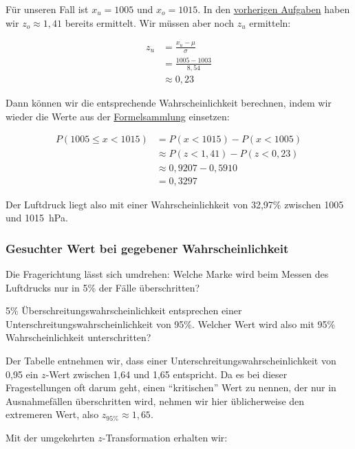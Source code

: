 \documentclass[
  11pt,
  ngerman,
  a4paper,
]{report}
\begin{document}
Für unseren Fall ist \(x_u=1005\) und \(x_o=1015\). In den \protect\hyperlink{unter}{vorherigen Aufgaben} haben wir \(z_o\approx1,41\) bereits ermittelt. Wir müssen aber noch \(z_u\) ermitteln:

\[\begin{aligned}
    z_u &= \frac{x_u-\mu}{\sigma} \\[4pt]
        &= \frac{1005-1003}{8{,}54}  \\[4pt]
        &\approx 0{,}23
\end{aligned}\]

Dann können wir die entsprechende Wahrscheinlichkeit berechnen, indem wir wieder die Werte aus der \href{Formelsammlung\%20und\%20Wertetabellen.pdf}{Formelsammlung} einsetzen:

\[
  \begin{aligned}
    P(1005 \leq x < 1015) &= P(x < 1015) - P(x < 1005) \\
    &\approx P(z < 1{,}41) - P(z < 0{,}23) \\
    &\approx 0{,}9207- 0{,}5910  \\
    &= 0{,}3297
  \end{aligned}
\]

Der Luftdruck liegt also mit einer Wahrscheinlichkeit von 32,97\% zwischen 1005 und 1015~hPa.

\hypertarget{gesuchter-wert-bei-gegebener-wahrscheinlichkeit}{%
\subsubsection{Gesuchter Wert bei gegebener Wahrscheinlichkeit}\label{gesuchter-wert-bei-gegebener-wahrscheinlichkeit}}

Die Fragerichtung lässt sich umdrehen: Welche Marke wird beim Messen des Luftdrucks nur in 5\% der Fälle überschritten?

5\% Überschreitungswahrscheinlichkeit entsprechen einer Unterschreitungswahrscheinlichkeit von 95\%. Welcher Wert wird also mit 95\% Wahrscheinlichkeit unterschritten?

Der Tabelle entnehmen wir, dass einer Unterschreitungswahrscheinlichkeit von 0,95 ein \(z\)-Wert zwischen 1,64 und 1,65 entspricht. Da es bei dieser Fragestellungen oft darum geht, einen \enquote{kritischen} Wert zu nennen, der nur in Ausnahmefällen überschritten wird, nehmen wir hier üblicherweise den extremeren Wert, also \(z_{95\%}\approx 1,65\).

Mit der umgekehrten \(z\)-Transformation erhalten wir:
\end{document}
